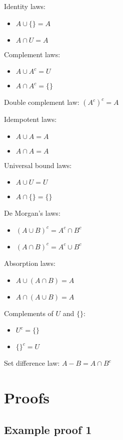 \documentclass[12pt, leqno]{article}
\begin{document}
Identity laws:
\begin{itemize}
    \item $A \cup \{\} = A$
    \item $A \cap U = A$
\end{itemize}

Complement laws:
\begin{itemize}
    \item $A \cup A^c = U$
    \item $A \cap A^c = \{\}$
\end{itemize}

Double complement law: $(A^c)^c = A$

Idempotent laws:
\begin{itemize}
    \item $A \cup A = A$
    \item $A \cap A = A$
\end{itemize}

Universal bound laws:
\begin{itemize}
    \item $A \cup U = U$
    \item $A \cap \{\} = \{\}$
\end{itemize}

De Morgan's laws:
\begin{itemize}
    \item $(A \cup B)^c = A^c \cap B^c$
    \item $(A \cap B)^c = A^c \cup B^c$
\end{itemize}

Absorption laws:
\begin{itemize}
    \item $A \cup (A \cap B) = A$
    \item $A \cap (A \cup B) = A$
\end{itemize}

Complements of $U$ and $\{\}$:
\begin{itemize}
    \item $U^c = \{\}$
    \item $\{\}^c = U$
\end{itemize}

Set difference law: $A - B = A \cap B^c$

\section*{Proofs}

\subsection*{Example proof 1}
\end{document}
